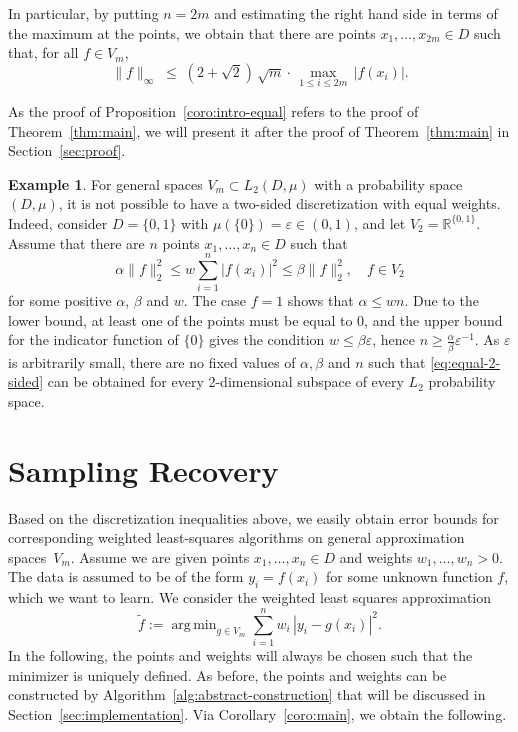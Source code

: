 \documentclass[a4paper,11pt]{article}
\renewcommand{\(}{\left (}
\renewcommand{\)}{\right )}
\newcommand{\<}{\langle}
\renewcommand{\>}{\rangle}
\newcommand{\eps}{\varepsilon}
\newcommand{\R}{\mathbb{R}}
\theoremstyle{definition}
\newtheorem{example}[theorem]{Example}
\DeclareMathOperator*{\argmin}{arg\,min}
\begin{document}
In particular, by putting $n=2m$ and estimating the right hand side in terms of the maximum at the points, we obtain
that there are points $x_1,\hdots,x_{2m} \in D$ such that, for all $f\in V_m$,
\[
\|f\|_\infty 
\;\leq\; (2 + \sqrt{2})\, \sqrt{m} \cdot\,
\max_{1\leq i \leq 2m}\, \left|f(x_i)\right|.
\]

As the proof of Proposition~\ref{coro:intro-equal} refers to the proof of Theorem~\ref{thm:main}, 
we will present it after the proof of Theorem~\ref{thm:main} in Section~\ref{sec:proof}.


\begin{example}
For general spaces $V_m \subset L_2(D,\mu)$ with a probability space $(D,\mu)$, 
it is not possible to have a two-sided discretization with equal weights. 
Indeed, consider $D=\{0,1\}$ with $\mu(\{0\})=\eps\in (0,1)$, 
and let $V_2=\R^{\{0,1\}}$.
Assume that there are $n$ points $x_1,\dots,x_n\in D$ such that
\begin{equation}\label{eq:equal-2-sided}
\alpha \|f\|_2^2
\leq w \sum_{i=1}^n |f(x_i)|^2
\leq \beta \|f\|_2^2,\quad f\in V_2
\end{equation}
for some positive $\alpha$, $\beta$ and $w$.
The case $f=1$ shows that $\alpha \leq  wn$. 
Due to the lower bound, at least one of the points must be equal to 0, and the upper bound for the indicator function of $\{0\}$ gives the condition $w\leq \beta \eps$, hence $n \geq \frac{\alpha}{\beta} \eps^{-1}$.
As $\eps$ is arbitrarily small, 
there are no fixed values of $\alpha,\beta$ and $n$
such that \eqref{eq:equal-2-sided} can be obtained
for every 2-dimensional subspace of every $L_2$ probability space. 
\end{example}


\section{Sampling Recovery}
\label{sec:sampling}


Based on the discretization inequalities above, 
we easily obtain error bounds for corresponding 
weighted least-squares algorithms
on general approximation spaces~$V_m$.
Assume we are given points $x_1,\hdots,x_n \in D$
and weights $w_1,\hdots,w_n>0$.
The data is assumed to be of the form $y_i = f(x_i)$
for some unknown function $f$, which we want to learn.
We consider the weighted least squares approximation
\begin{equation}\label{def:wls}
\tilde f := \argmin_{g\in V_m} \sum_{i=1}^n w_i\, |y_i -g(x_i)|^2.
\end{equation}
In the following, the points and weights will always be chosen such that the minimizer is uniquely defined. 
As before, the points and weights can be constructed by Algorithm~\ref{alg:abstract-construction} that will be discussed in Section~\ref{sec:implementation}.
Via Corollary~\ref{coro:main},
we obtain the following.
\end{document}
